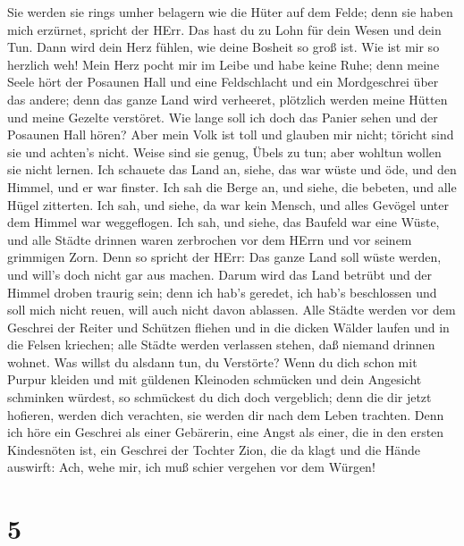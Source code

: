  Sie werden sie rings umher belagern wie die Hüter auf dem
Felde; denn sie haben mich erzürnet, spricht der HErr.  Das
hast du zu Lohn für dein Wesen und dein Tun. Dann wird dein Herz fühlen,
wie deine Bosheit so groß ist.  Wie ist mir so herzlich
weh! Mein Herz pocht mir im Leibe und habe keine Ruhe; denn meine Seele
hört der Posaunen Hall und eine Feldschlacht  und ein
Mordgeschrei über das andere; denn das ganze Land wird verheeret,
plötzlich werden meine Hütten und meine Gezelte verstöret. 
Wie lange soll ich doch das Panier sehen und der Posaunen Hall hören?
 Aber mein Volk ist toll und glauben mir nicht; töricht
sind sie und achten's nicht. Weise sind sie genug, Übels zu tun; aber
wohltun wollen sie nicht lernen.  Ich schauete das Land an,
siehe, das war wüste und öde, und den Himmel, und er war finster.
 Ich sah die Berge an, und siehe, die bebeten, und alle
Hügel zitterten.  Ich sah, und siehe, da war kein Mensch,
und alles Gevögel unter dem Himmel war weggeflogen.  Ich
sah, und siehe, das Baufeld war eine Wüste, und alle Städte drinnen
waren zerbrochen vor dem HErrn und vor seinem grimmigen Zorn.
 Denn so spricht der HErr: Das ganze Land soll wüste
werden, und will's doch nicht gar aus machen.  Darum wird
das Land betrübt und der Himmel droben traurig sein; denn ich hab's
geredet, ich hab's beschlossen und soll mich nicht reuen, will auch
nicht davon ablassen.  Alle Städte werden vor dem Geschrei
der Reiter und Schützen fliehen und in die dicken Wälder laufen und in
die Felsen kriechen; alle Städte werden verlassen stehen, daß niemand
drinnen wohnet.  Was willst du alsdann tun, du Verstörte?
Wenn du dich schon mit Purpur kleiden und mit güldenen Kleinoden
schmücken und dein Angesicht schminken würdest, so schmückest du dich
doch vergeblich; denn die dir jetzt hofieren, werden dich verachten, sie
werden dir nach dem Leben trachten.  Denn ich höre ein
Geschrei als einer Gebärerin, eine Angst als einer, die in den ersten
Kindesnöten ist, ein Geschrei der Tochter Zion, die da klagt und die
Hände auswirft: Ach, wehe mir, ich muß schier vergehen vor dem Würgen!

\hypertarget{section-4}{%
\section{5}\label{section-4}}

